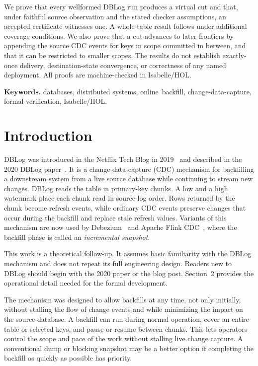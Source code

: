 \documentclass[letterpaper,10pt,twocolumn]{article}
\begin{document}
We prove that every wellformed DBLog run produces a virtual cut and that,
under faithful source observation and the stated checker assumptions, an
accepted certificate witnesses one. A whole-table result follows under
additional coverage conditions. We also prove that a cut advances to later
frontiers by appending the source CDC events for keys in scope committed in
between, and that it can be restricted to smaller scopes.
The results do not establish exactly-once delivery, destination-state
convergence, or correctness of any named deployment. All proofs are
machine-checked in Isabelle/HOL.

\smallskip
\noindent\textbf{Keywords.}\label{keywords}\enspace
databases, distributed systems, \mbox{online backfill},
change-data-capture, formal verification, Isabelle/HOL.

\section{Introduction}\label{introduction}

DBLog was introduced in the Netflix Tech Blog in
2019~\citep{dblog_netflix_blog} and described in the 2020 DBLog
paper~\citep{andreakis2020dblog}. It is a change-data-capture (CDC)
mechanism for backfilling a downstream system from a live source
database while continuing to stream new changes. DBLog reads the table
in primary-key chunks. A low and a high watermark place each chunk read
in source-log order. Rows returned by the chunk become refresh events,
while ordinary CDC events preserve changes that occur during the
backfill and replace stale refresh values. Variants of this mechanism
are now used by Debezium~\citep{debezium_incremental_snapshot} and
Apache Flink CDC~\citep{flink_cdc_incremental_snapshot}, where the
backfill phase is called an \emph{incremental snapshot}.

This work is a theoretical follow-up. It assumes basic familiarity with
the DBLog mechanism and does not repeat its full engineering design.
Readers new to DBLog should begin with the 2020 paper or the blog post.
Section~2 provides the operational detail needed
for the formal development.

The mechanism was designed to allow backfills at any time, not only
initially, without stalling the flow of change events and while minimizing
the impact on the source database. A backfill can run during normal
operation, cover an entire table or selected keys, and pause or resume
between chunks. This lets operators control the scope and pace of the
work without stalling live change capture. A conventional dump or
blocking snapshot may be a better option if completing the backfill as
quickly as possible has priority.
\end{document}
